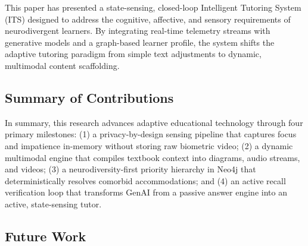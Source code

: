 \documentclass[final,5p,times,twocolumn,authoryear]{elsarticle}
\begin{document}
This paper has presented a state-sensing, closed-loop Intelligent Tutoring System (ITS) designed to address the cognitive, affective, and sensory requirements of neurodivergent learners. By integrating real-time telemetry streams with generative models and a graph-based learner profile, the system shifts the adaptive tutoring paradigm from simple text adjustments to dynamic, multimodal content scaffolding.

\subsection{Summary of Contributions}
\label{subsec:summary_contributions}

In summary, this research advances adaptive educational technology through four primary milestones: (1) a privacy-by-design sensing pipeline that captures focus and impatience in-memory without storing raw biometric video; (2) a dynamic multimodal engine that compiles textbook context into diagrams, audio streams, and videos; (3) a neurodiversity-first priority hierarchy in Neo4j that deterministically resolves comorbid accommodations; and (4) an active recall verification loop that transforms GenAI from a passive answer engine into an active, state-sensing tutor.

\subsection{Future Work}
\label{subsec:future_work}
\end{document}
